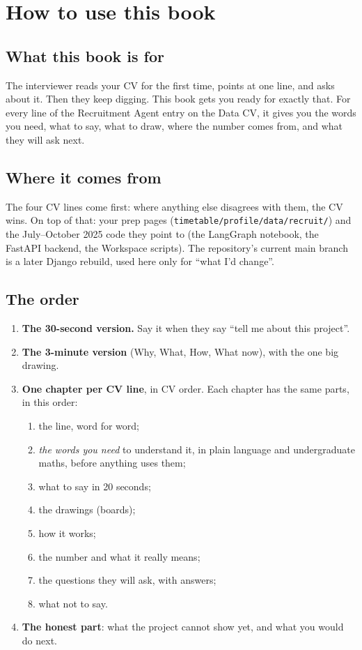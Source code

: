 \chapter{How to use this book}

\section*{What this book is for}
The interviewer reads your CV for the first time, points at one line, and asks about it. Then they keep digging. This book gets you ready for exactly that. For every line of the Recruitment Agent entry on the Data CV, it gives you the words you need, what to say, what to draw, where the number comes from, and what they will ask next.

\section*{Where it comes from}
The four CV lines come first: where anything else disagrees with them, the CV wins. On top of that: your prep pages (\texttt{timetable/\allowbreak profile/\allowbreak data/\allowbreak recruit/}) and the July--October 2025 code they point to (the LangGraph notebook, the FastAPI backend, the Workspace scripts). The repository's current main branch is a later Django rebuild, used here only for ``what I'd change''.

\section*{The order}
\begin{enumerate}
  \item \textbf{The 30-second version.} Say it when they say ``tell me about this project''.
  \item \textbf{The 3-minute version} (Why, What, How, What now), with the one big drawing.
  \item \textbf{One chapter per CV line}, in CV order. Each chapter has the same parts, in this order:
  \begin{enumerate}
    \item the line, word for word;
    \item \emph{the words you need} to understand it, in plain language and undergraduate maths, before anything uses them;
    \item what to say in 20 seconds;
    \item the drawings (boards);
    \item how it works;
    \item the number and what it really means;
    \item the questions they will ask, with answers;
    \item what not to say.
  \end{enumerate}
  \item \textbf{The honest part}: what the project cannot show yet, and what you would do next.
\end{enumerate}

